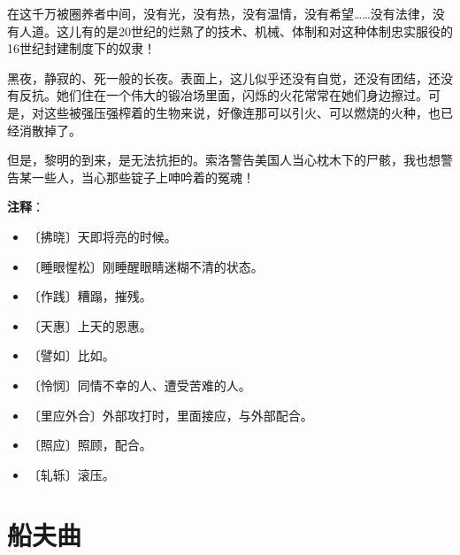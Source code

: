\documentclass[12pt,UTF-8,openany]{ctexbook}
\begin{document}
\begin{large}
    在这千万被圈养者中间，没有光，没有热，没有温情，没有希望……没有法律，没有人道。这儿有的是20世纪的烂熟了的技术、机械、体制和对这种体制忠实服役的16世纪封建制度下的奴隶！
    
    黑夜，静寂的、死一般的长夜。表面上，这儿似乎还没有自觉，还没有团结，还没有反抗。她们住在一个伟大的锻冶场里面，闪烁的火花常常在她们身边擦过。可是，对这些被强压强榨着的生物来说，好像连那可以引火、可以燃烧的火种，也已经消散掉了。
    
    但是，黎明的到来，是无法抗拒的。索洛警告美国人当心枕木下的尸骸，我也想警告某一些人，当心那些锭子上呻吟着的冤魂！
    
\end{large}


\newpage

\textbf{注释}：

\vspace{-1em}

\begin{itemize}
    \setlength\itemsep{-0.2em}
    \item 〔拂晓〕天即将亮的时候。
    \item 〔睡眼惺松〕刚睡醒眼睛迷糊不清的状态。
    \item 〔作践〕糟蹋，摧残。
    \item 〔天惠〕上天的恩惠。
    \item 〔譬如〕比如。
    \item 〔怜悯〕同情不幸的人、遭受苦难的人。
    \item 〔里应外合〕外部攻打时，里面接应，与外部配合。
    \item 〔照应〕照顾，配合。
    \item 〔轧轹〕滚压。
\end{itemize}

\chapter{船夫曲}
\end{document}
